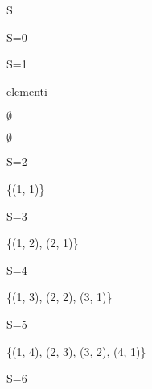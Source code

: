 \documentclass[a4paper,portrait,12pt]{article}
\begin{document}
\begin{flushleft}
S
\end{flushleft}


\begin{flushleft}
S=0
\end{flushleft}


\begin{flushleft}
S=1
\end{flushleft}





\begin{flushleft}
elementi
\end{flushleft}


$\emptyset$


$\emptyset$





\begin{flushleft}
S=2
\end{flushleft}





\{(1, 1)\}





\begin{flushleft}
S=3
\end{flushleft}





\{(1, 2), (2, 1)\}





\begin{flushleft}
S=4
\end{flushleft}





\{(1, 3), (2, 2), (3, 1)\}





\begin{flushleft}
S=5
\end{flushleft}





\{(1, 4), (2, 3), (3, 2), (4, 1)\}





\begin{flushleft}
S=6
\end{flushleft}
\end{document}
